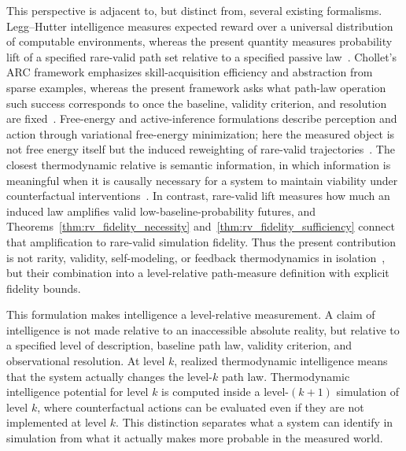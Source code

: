 \documentclass[
  aps,
  prresearch,
  reprint,
  amsmath,
  amssymb,
  superscriptaddress,
  nofootinbib,
  longbibliography
]{revtex4-2}
\begin{document}
This perspective is adjacent to, but distinct from, several existing formalisms. Legg--Hutter intelligence measures expected reward over a universal distribution of computable environments, whereas the present quantity measures probability lift of a specified rare-valid path set relative to a specified passive law~\citep{legg2007universal}. Chollet's ARC framework emphasizes skill-acquisition efficiency and abstraction from sparse examples, whereas the present framework asks what path-law operation such success corresponds to once the baseline, validity criterion, and resolution are fixed~\citep{chollet2019measure}. Free-energy and active-inference formulations describe perception and action through variational free-energy minimization; here the measured object is not free energy itself but the induced reweighting of rare-valid trajectories~\citep{friston2010free}. The closest thermodynamic relative is semantic information, in which information is meaningful when it is causally necessary for a system to maintain viability under counterfactual interventions~\citep{kolchinsky2018semantic}. In contrast, rare-valid lift measures how much an induced law amplifies valid low-baseline-probability futures, and Theorems~\ref{thm:rv_fidelity_necessity} and~\ref{thm:rv_fidelity_sufficiency} connect that amplification to rare-valid simulation fidelity. Thus the present contribution is not rarity, validity, self-modeling, or feedback thermodynamics in isolation~\citep{sagawa2010generalized,parrondo2015thermodynamics}, but their combination into a level-relative path-measure definition with explicit fidelity bounds.

This formulation makes intelligence a level-relative measurement. A claim of intelligence is not made relative to an inaccessible absolute reality, but relative to a specified level of description, baseline path law, validity criterion, and observational resolution. At level \(k\), realized thermodynamic intelligence means that the system actually changes the level-\(k\) path law. Thermodynamic intelligence potential for level \(k\) is computed inside a level-\((k+1)\) simulation of level \(k\), where counterfactual actions can be evaluated even if they are not implemented at level \(k\). This distinction separates what a system can identify in simulation from what it actually makes more probable in the measured world.
\end{document}
